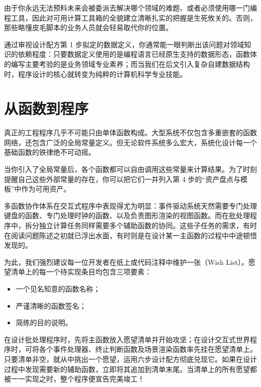 由于你永远无法预料未来会被委派去解决哪个领域的难题、或者必须使用哪一门编程工具，因此对可用计算工具箱的全貌建立清晰扎实的把握是生死攸关的。否则，那些略懂皮毛脚本的业务人员就会轻易取代你的位置。

通过审视设计配方第 1 步拟定的数据定义，你通常能一眼判断出该问题对领域知识的依赖程度：只要数据定义使用的是编程语言已经原生支持的数据形态，函数体的编写主要考验的是业务领域专业素养；而当我们在后文引入复杂自建数据结构时，程序设计的核心就转变为纯粹的计算机科学专业技能。


\section{从函数到程序}
\label{sec:3.4}

真正的工程程序几乎不可能只由单体函数构成。大型系统不仅包含多重嵌套的函数网络，还包含广泛的全局常量定义。但无论软件系统多么宏大，系统化设计每一个基础函数的铁律绝不可动摇。

当你引入了全局常量后，各个函数都可以自由调用这些常量来计算结果。为了时刻提醒自己这些外部常量的存在，你可以把它们一并列入第 4 步的“资产盘点与模板”中作为可用资产。

多函数协作体系在交互式程序中表现得尤为明显：事件驱动系统天然需要专门处理键盘的函数、专门处理时钟的函数、以及负责图形渲染的视图函数。而在批处理程序中，拆分独立计算任务同样需要多个辅助函数的协同。这些子任务的需求，有时在阅读问题陈述之初就已浮出水面，有时则是在设计某一主函数的过程中中途顿悟发现的。

为此，我们强烈建议每一位开发者在纸上或代码注释中维护一张（Wish List）。愿望清单上的每一个待实现条目均包含三项要素：
\begin{itemize}
  \item 一个见名知意的函数名称；
  \item 严谨清晰的函数签名；
  \item 简练的目的说明。
\end{itemize}

在设计批处理程序时，先将主函数放入愿望清单并开始攻坚；在设计交互式世界程序时，可将各个事件处理器、终止判断函数及场景渲染函数率先挂在愿望清单上。只要清单非空，就从中挑出一个愿望，运用六步设计配方彻底兑现它。如果在设计过程中发现需要新的辅助函数，立即将其追加到清单末尾。当清单上的所有愿望都被一一实现之时，整个程序便宣告完美竣工！


